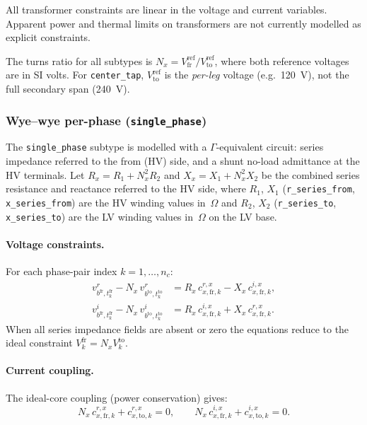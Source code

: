 \documentclass[11pt,a4paper]{article}
\newcommand{\vr}[2]{v^r_{#1,#2}}
\newcommand{\vi}[2]{v^i_{#1,#2}}
\begin{document}
All transformer constraints are linear in the voltage and current variables.
Apparent power and thermal limits on transformers are not currently modelled
as explicit constraints.

The turns ratio for all subtypes is
$N_x = V^\text{ref}_\text{fr} / V^\text{ref}_\text{to}$,
where both reference voltages are in SI volts.  For \texttt{center\_tap},
$V^\text{ref}_\text{to}$ is the \emph{per-leg} voltage (e.g.\ 120~V), not
the full secondary span (240~V).

\subsubsection*{Wye--wye per-phase (\texttt{single\_phase})}

The \texttt{single\_phase} subtype is modelled with a
$\Gamma$-equivalent circuit: series impedance referred to the from (HV) side,
and a shunt no-load admittance at the HV terminals.
Let $R_x = R_1 + N_x^2 R_2$ and $X_x = X_1 + N_x^2 X_2$ be the combined
series resistance and reactance referred to the HV side, where $R_1$, $X_1$
(\texttt{r\_series\_from}, \texttt{x\_series\_from}) are the HV winding
values in~$\Omega$ and $R_2$, $X_2$
(\texttt{r\_series\_to}, \texttt{x\_series\_to}) are the LV winding values
in~$\Omega$ on the LV base.

\paragraph{Voltage constraints.}
For each phase-pair index $k = 1,\ldots,n_c$:
%
\begin{align}
  \vr{b^\text{fr}}{t^\text{fr}_k} - N_x\,\vr{b^\text{to}}{t^\text{to}_k}
  &= R_x\,c^{r,x}_{x,\text{fr},k} - X_x\,c^{i,x}_{x,\text{fr},k},
  \label{eq:yy-v-r}\\
  \vi{b^\text{fr}}{t^\text{fr}_k} - N_x\,\vi{b^\text{to}}{t^\text{to}_k}
  &= R_x\,c^{i,x}_{x,\text{fr},k} + X_x\,c^{r,x}_{x,\text{fr},k}.
  \label{eq:yy-v-i}
\end{align}
%
When all series impedance fields are absent or zero the equations reduce to
the ideal constraint $V^\text{fr}_k = N_x V^\text{to}_k$.

\paragraph{Current coupling.}
The ideal-core coupling (power conservation) gives:
%
\begin{equation}
  N_x\,c^{r,x}_{x,\text{fr},k} + c^{r,x}_{x,\text{to},k} = 0,
  \qquad
  N_x\,c^{i,x}_{x,\text{fr},k} + c^{i,x}_{x,\text{to},k} = 0.
  \label{eq:yy-i}
\end{equation}
\end{document}

